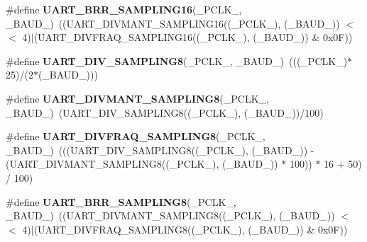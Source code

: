 \begin{DoxyCompactItemize}
\item 
\#define {\bfseries U\+A\+R\+T\+\_\+\+B\+R\+R\+\_\+\+S\+A\+M\+P\+L\+I\+N\+G16}(\+\_\+\+P\+C\+L\+K\+\_\+,  \+\_\+\+B\+A\+U\+D\+\_\+)~((U\+A\+R\+T\+\_\+\+D\+I\+V\+M\+A\+N\+T\+\_\+\+S\+A\+M\+P\+L\+I\+N\+G16((\+\_\+\+P\+C\+L\+K\+\_\+), (\+\_\+\+B\+A\+U\+D\+\_\+)) $<$$<$ 4)$\vert$(U\+A\+R\+T\+\_\+\+D\+I\+V\+F\+R\+A\+Q\+\_\+\+S\+A\+M\+P\+L\+I\+N\+G16((\+\_\+\+P\+C\+L\+K\+\_\+), (\+\_\+\+B\+A\+U\+D\+\_\+)) \& 0x0\+F))\hypertarget{group___u_a_r_t___private___macros_gaed98b14acfc939985cc9909a6fa64d71}{}\label{group___u_a_r_t___private___macros_gaed98b14acfc939985cc9909a6fa64d71}

\item 
\#define {\bfseries U\+A\+R\+T\+\_\+\+D\+I\+V\+\_\+\+S\+A\+M\+P\+L\+I\+N\+G8}(\+\_\+\+P\+C\+L\+K\+\_\+,  \+\_\+\+B\+A\+U\+D\+\_\+)~(((\+\_\+\+P\+C\+L\+K\+\_\+)$\ast$25)/(2$\ast$(\+\_\+\+B\+A\+U\+D\+\_\+)))\hypertarget{group___u_a_r_t___private___macros_ga97075bc06a62c182b0b9a00bbf04b170}{}\label{group___u_a_r_t___private___macros_ga97075bc06a62c182b0b9a00bbf04b170}

\item 
\#define {\bfseries U\+A\+R\+T\+\_\+\+D\+I\+V\+M\+A\+N\+T\+\_\+\+S\+A\+M\+P\+L\+I\+N\+G8}(\+\_\+\+P\+C\+L\+K\+\_\+,  \+\_\+\+B\+A\+U\+D\+\_\+)~(U\+A\+R\+T\+\_\+\+D\+I\+V\+\_\+\+S\+A\+M\+P\+L\+I\+N\+G8((\+\_\+\+P\+C\+L\+K\+\_\+), (\+\_\+\+B\+A\+U\+D\+\_\+))/100)\hypertarget{group___u_a_r_t___private___macros_ga3dafeed17fc4cf319b0dd88d7d0fb614}{}\label{group___u_a_r_t___private___macros_ga3dafeed17fc4cf319b0dd88d7d0fb614}

\item 
\#define {\bfseries U\+A\+R\+T\+\_\+\+D\+I\+V\+F\+R\+A\+Q\+\_\+\+S\+A\+M\+P\+L\+I\+N\+G8}(\+\_\+\+P\+C\+L\+K\+\_\+,  \+\_\+\+B\+A\+U\+D\+\_\+)~(((U\+A\+R\+T\+\_\+\+D\+I\+V\+\_\+\+S\+A\+M\+P\+L\+I\+N\+G8((\+\_\+\+P\+C\+L\+K\+\_\+), (\+\_\+\+B\+A\+U\+D\+\_\+)) -\/ (U\+A\+R\+T\+\_\+\+D\+I\+V\+M\+A\+N\+T\+\_\+\+S\+A\+M\+P\+L\+I\+N\+G8((\+\_\+\+P\+C\+L\+K\+\_\+), (\+\_\+\+B\+A\+U\+D\+\_\+)) $\ast$ 100)) $\ast$ 16 + 50) / 100)\hypertarget{group___u_a_r_t___private___macros_gae0c8a28dbc006a93dd8e90e8ff8a37a0}{}\label{group___u_a_r_t___private___macros_gae0c8a28dbc006a93dd8e90e8ff8a37a0}

\item 
\#define {\bfseries U\+A\+R\+T\+\_\+\+B\+R\+R\+\_\+\+S\+A\+M\+P\+L\+I\+N\+G8}(\+\_\+\+P\+C\+L\+K\+\_\+,  \+\_\+\+B\+A\+U\+D\+\_\+)~((U\+A\+R\+T\+\_\+\+D\+I\+V\+M\+A\+N\+T\+\_\+\+S\+A\+M\+P\+L\+I\+N\+G8((\+\_\+\+P\+C\+L\+K\+\_\+), (\+\_\+\+B\+A\+U\+D\+\_\+)) $<$$<$ 4)$\vert$(U\+A\+R\+T\+\_\+\+D\+I\+V\+F\+R\+A\+Q\+\_\+\+S\+A\+M\+P\+L\+I\+N\+G8((\+\_\+\+P\+C\+L\+K\+\_\+), (\+\_\+\+B\+A\+U\+D\+\_\+)) \& 0x0\+F))\hypertarget{group___u_a_r_t___private___macros_gae36ed9e94681494a31a9d8a7bbcc1a2c}{}\label{group___u_a_r_t___private___macros_gae36ed9e94681494a31a9d8a7bbcc1a2c}

\end{DoxyCompactItemize}


